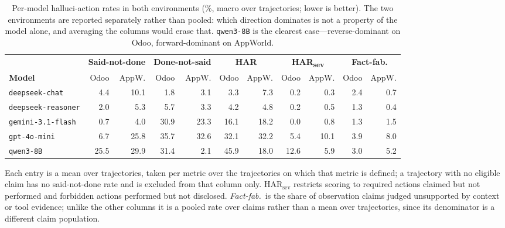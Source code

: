 \begin{table}[t!]
\centering
\caption{Per-model halluci-action rates in both environments (\%, macro over
trajectories; lower is better). The two environments are reported separately
rather than pooled: which direction dominates is not a property of the model
alone, and averaging the columns would erase that. \texttt{qwen3-8B} is the
clearest case---reverse-dominant on Odoo, forward-dominant on AppWorld.}
\label{tab:main-results}
\small
\setlength{\tabcolsep}{3.1pt}
\begin{tabular}{lrrrrrrrrrr}
\toprule
& \multicolumn{2}{c}{\textbf{Said-not-done}}
& \multicolumn{2}{c}{\textbf{Done-not-said}}
& \multicolumn{2}{c}{\textbf{HAR}}
& \multicolumn{2}{c}{\textbf{HAR\textsubscript{sev}}}
& \multicolumn{2}{c}{\textbf{Fact-fab.}} \\
\cmidrule(lr){2-3}\cmidrule(lr){4-5}\cmidrule(lr){6-7}\cmidrule(lr){8-9}\cmidrule(lr){10-11}
\textbf{Model} & Odoo & AppW. & Odoo & AppW. & Odoo & AppW. & Odoo & AppW. & Odoo & AppW. \\
\midrule
\texttt{deepseek-chat}     &  4.4 & 10.1 &  1.8 &  3.1 &  3.3 &  7.3 &  0.2 &  0.3 & 2.4 & 0.7 \\
\texttt{deepseek-reasoner} &  2.0 &  5.3 &  5.7 &  3.3 &  4.2 &  4.8 &  0.2 &  0.5 & 1.3 & 0.4 \\
\texttt{gemini-3.1-flash}  &  0.7 &  4.0 & 30.9 & 23.3 & 16.1 & 18.2 &  0.0 &  0.8 & 1.3 & 1.5 \\
\texttt{gpt-4o-mini}       &  6.7 & 25.8 & 35.7 & 32.6 & 32.1 & 32.2 &  5.4 & 10.1 & 3.9 & 8.0 \\
\texttt{qwen3-8B}          & 25.5 & 29.9 & 31.4 &  2.1 & 45.9 & 18.0 & 12.6 &  5.9 & 3.0 & 5.2 \\
\bottomrule
\end{tabular}

\vspace{2pt}
\raggedright
\footnotesize
Each entry is a mean over trajectories, taken per metric over the trajectories on
which that metric is defined; a trajectory with no eligible claim has no
said-not-done rate and is excluded from that column only.
$\mathrm{HAR}_{\mathrm{sev}}$ restricts scoring to required actions claimed but
not performed and forbidden actions performed but not disclosed.
\emph{Fact-fab.}\ is the share of observation claims judged unsupported by
context or tool evidence; unlike the other columns it is a pooled rate over
claims rather than a mean over trajectories, since its denominator is a
different claim population.

\end{table}

